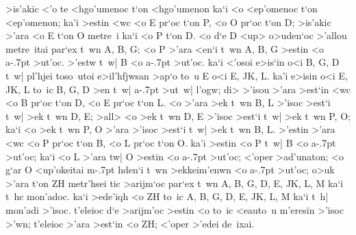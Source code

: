 \begin{Parallel}{}{}
{{>is'akic  <'o te <hgo'umenoc t`on  <hgo'umenon ka`i <o  <ep'omenoc t`on
<ep'omenon; ka'i >estin <wc <o E pr`oc t`on P, <o O
pr`oc t`on D;  >is'akic >'ara <o E t`on O metre~i ka`i <o P t`on D.
 <o d`e D <up> o>uden`oc >'allou metre~itai
par`ex t~wn A, B, G; <o P >'ara <en`i t~wn A, B, G >estin <o a\kern -.7pt >ut'oc. >'estw
t~w| B <o a\kern -.7pt >ut'oc. ka`i <'osoi e>is`in o<i B, G, D t~w| pl'hjei toso~utoi
e>il'hfjwsan >ap`o to~u E o<i E, JK, L. ka'i e>isin o<i E, JK, L to~ic
B, G, D >en t~w| a\kern -.7pt >ut~w| l'ogw; di> >'isou >'ara >est`in <wc <o B pr`oc
t`on D, <o E pr`oc t`on L. <o >'ara >ek t~wn B, L >'isoc >est`i t~w| >ek t~wn
D, E; >all> <o >ek t~wn D, E >'isoc >est`i t~w| >ek t~wn
P, O; ka`i <o >ek t~wn P, O >'ara >'isoc >est`i t~w| >ek t~wn B, L. >'estin
>'ara <wc <o P pr`oc t`on B, <o L pr`oc t`on O. ka'i >estin <o P t~w| B
<o a\kern -.7pt >ut'oc; ka`i <o L >'ara tw| O >estin <o a\kern -.7pt >ut'oc;  <'oper >ad'unaton;
<o g`ar O <up'okeitai m\kern -.7pt hden`i t~wn >ekkeim'enwn <o a\kern -.7pt >ut'oc; o>uk
>'ara t`on ZH metr'hsei tic >arijm`oc par`ex t~wn A, B, G, D, E, JK, L, M
ka`i t~hc mon'adoc. ka`i >ede'iqh <o ZH to~ic A, B, G, D, E, JK, L, M
ka`i t~h| mon'adi >'isoc. t'eleioc d`e >arijm'oc >estin <o to~ic <eauto~u
m'eresin >'isoc >'wn; t'eleioc >'ara >est`in <o ZH; <'oper >'edei de~ixai.}}

\end{Parallel}
